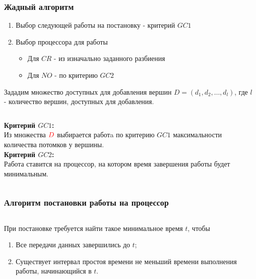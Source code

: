 \begin{frame}
    \frametitle{Жадный алгоритм}
    \begin{enumerate}
        \item Выбор следующей работы на постановку - критерий $GC1$
        \item Выбор процессора для работы
        \begin{itemize}
            \item Для $CR$ - из изначально заданного разбиения
            \item Для $NO$ - по критерию $GC2$
        \end{itemize}
    \end{enumerate}
    Зададим множество доступных для добавления вершин $D= \left( d_1, d_2, \dots, d_l \right)$, где $l$ - количество вершин, доступных для добавления.
    \begin{columns}
        \begin{column}{0.6\textwidth}
            \textbf{Критерий $GC1$:} \\
    Из множества $\color{red}D$ выбирается работa по критерию $GC1$ максимальности количества потомков у вершины. \\
            \textbf{Критерий $GC2$:} \\
        Работа ставится на процессор, на котором время завершения работы будет минимальным.

        \end{column}
        \begin{column}{0.4\textwidth}
        \end{column}
    \end{columns}
\end{frame}

\begin{frame}
    \frametitle{Алгоритм постановки работы на процессор}
    \begin{columns}
        \begin{column}{0.55\textwidth}
            При постановке требуется найти такое минимальное время $t$, чтобы
            \begin{enumerate}
                \item Все передачи данных завершились до $t$;
                \item Существует интервал простоя времени не меньший времени выполнения работы, начинающийся в $t$.
            \end{enumerate}
        \end{column}
        \begin{column}{0.45\textwidth}
            {
                \tiny
            }
            {
                \tiny
            }
        \end{column}
    \end{columns}
\end{frame}


